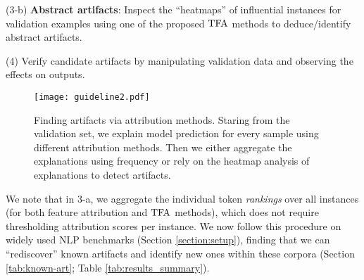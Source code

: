 \documentclass[11pt]{article}
\begin{document}
\vspace{0.2em}
\noindent (3-b) \textbf{Abstract artifacts}: Inspect the ``heatmaps'' of influential instances for validation examples using one of the proposed $\text{TFA}$ methods to deduce/identify abstract artifacts. 
    
\vspace{0.2em}
 \noindent (4) Verify candidate artifacts by manipulating validation data and observing the effects on outputs.


\begin{figure}[bt]
    \centering
    \texttt{[image: guideline2.pdf]}
    \caption{Finding artifacts via attribution methods. Staring from the validation set, we explain model prediction for every sample using different attribution methods. Then we either aggregate the explanations using frequency or rely on the heatmap analysis of explanations to detect artifacts.}
    \label{fig:guide}
    \minipostspace{}
\end{figure}

\vspace{.2em} 

We note that in 3-a, we aggregate the individual token \emph{rankings} over all instances (for both feature attribution and $\text{TFA}$ methods), which does not require thresholding attribution scores per instance.
We now follow this procedure on widely used NLP benchmarks (Section \ref{section:setup}), finding that we can ``rediscover'' known artifacts and identify new ones within these corpora (Section  \ref{tab:known-art}; Table \ref{tab:results_summary}).

\end{document}
